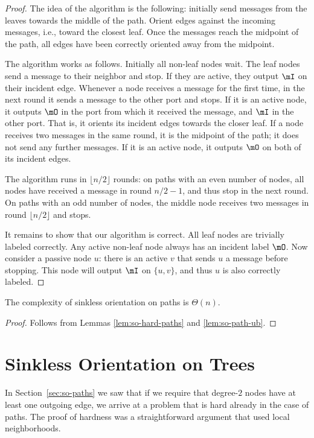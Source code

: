 \begin{proof}
	The idea of the algorithm is the following: initially send messages from the leaves towards the middle of the path. Orient edges against the incoming messages, i.e., toward the closest leaf. Once the messages reach the midpoint of the path, all edges have been correctly oriented away from the midpoint.

	The algorithm works as follows. Initially all non-leaf nodes wait. The leaf nodes send a message to their neighbor and stop. If they are active, they output $\mI$ on their incident edge. 
	Whenever a node receives a message for the first time, in the next round it sends a message to the other port and stops. If it is an active node, it outputs $\mO$ in the port from which it received the message, and $\mI$ in the other port. That is, it orients its incident edges towards the closer leaf. If a node receives two messages in the same round, it is the midpoint of the path; it does not send any further messages. If it is an active node, it outputs $\mO$ on both of its incident edges.

	The algorithm runs in $\lfloor n/2 \rfloor$ rounds: on paths with an even number of nodes, all nodes have received a message in round $n/2 - 1$, and thus stop in the next round. On paths with an odd number of nodes, the middle node receives two messages in round $\lfloor n/2 \rfloor$ and stops.

	It remains to show that our algorithm is correct. All leaf nodes are trivially labeled correctly. Any active non-leaf node always has an incident label $\mO$. Now consider a passive node $u$: there is an active $v$ that sends $u$ a message before stopping. This node will output $\mI$ on $\{u,v\}$, and thus $u$ is also correctly labeled.
\end{proof}

\begin{theorem}
	The complexity of sinkless orientation on paths is $\Theta(n)$.
\end{theorem}

\begin{proof}
	Follows from Lemmas \ref{lem:so-hard-paths} and \ref{lem:so-path-ub}.
\end{proof}

\section{Sinkless Orientation on Trees}

In Section~\ref{sec:so-paths} we saw that if we require that degree-$2$ nodes have at least one outgoing edge, we arrive at a problem that is hard already in the case of paths. The proof of hardness was a straightforward argument that used local neighborhoods.

